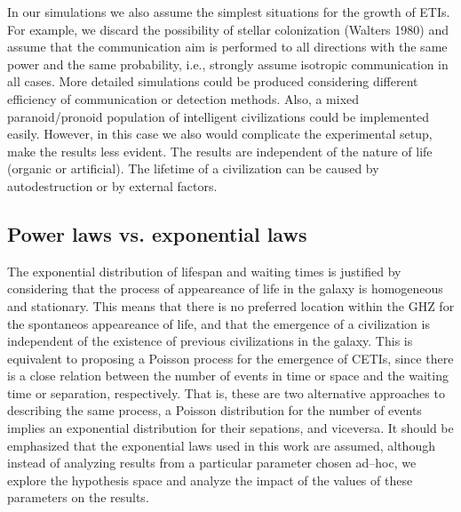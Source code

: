 \documentclass[crop]{CSLB}%
\begin{document}
In our simulations we also assume the simplest situations for the
growth of ETIs.
%
For example, we discard the possibility of stellar colonization
(Walters 1980) and assume that the communication aim is performed to
all directions with the same power and the same probability, i.e.,
strongly assume isotropic communication in all cases.
%
More detailed simulations could be produced considering different 
efficiency of communication or detection methods.
%
Also, a mixed paranoid/pronoid population of intelligent civilizations
could be implemented easily.
%
However, in this case we also would complicate the experimental setup,
make the results less evident.
%
The results are independent of the nature of life (organic or
artificial).
%
The lifetime of a civilization can be caused by autodestruction or by
external factors.




\subsection{Power laws vs. exponential laws}

The exponential distribution of lifespan and waiting times is
justified by considering that the process of appeareance of life in
the galaxy is homogeneous and stationary.
%
This means that there is no preferred location within the GHZ for the
spontaneos appeareance of life, and that the emergence of a
civilization is independent of the existence of previous civilizations 
in the galaxy.
%            
This is equivalent to proposing a Poisson process for the emergence of
CETIs, since there is a close relation between the number of events in
time or space and the waiting time or separation, respectively.
%
That is, these are two alternative approaches to describing the same
process, a Poisson distribution for the number of events implies an
exponential distribution for their sepations, and viceversa.
%
It should be emphasized that the exponential laws used in this work
are assumed, although instead of analyzing results from a particular
parameter chosen ad--hoc, we explore the hypothesis space and analyze
the impact of the values of these parameters on the results.
%                                                           
\end{document}

